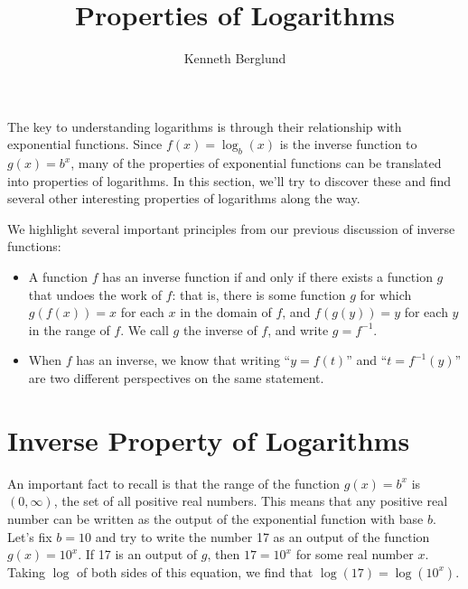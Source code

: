 \documentclass[nooutcomes]{ximera}
\author{Kenneth Berglund}
\title{Properties of Logarithms}
\begin{document}
\begin{abstract}
  
\end{abstract}
\maketitle




The key to understanding logarithms is through their relationship with exponential functions. Since $f(x) = \log_b(x)$ is the inverse function to $g(x) = b^x$, many of the properties of exponential functions can be translated into properties of logarithms. In this section, we'll try to discover these and find several other interesting properties of logarithms along the way.

We highlight several important principles from our previous discussion of inverse functions:
\begin{itemize}
\item
A function $f$ has an inverse function if and only if there exists a function $g$ that undoes the work of $f$: that is, there is some function $g$ for which $g(f(x)) = x$ for each $x$ in the domain of $f$, and $f(g(y)) = y$ for each $y$ in the range of $f$. We call $g$ the inverse of $f$, and write $g = f^{-1}$.%
\item
When $f$ has an inverse, we know that writing ``$y = f(t)$'' and ``$t = f^{-1}(y)$''  are two different perspectives on the same statement.
\end{itemize}
%


\section{Inverse Property of Logarithms}

An important fact to recall is that the range of the function $g(x) = b^x$ is $(0, \infty)$, the set of all positive real numbers. This means that any positive real number can be written as the output of the exponential function with base $b$. Let's fix $b = 10$ and try to write the number 17 as an output of the function $g(x) = 10^x$. If 17 is an output of $g$, then $17 = 10^x$ for some real number $x$. Taking $\log$ of both sides of this equation, we find that $\log(17) = \log(10^x)$. 
\end{document}
